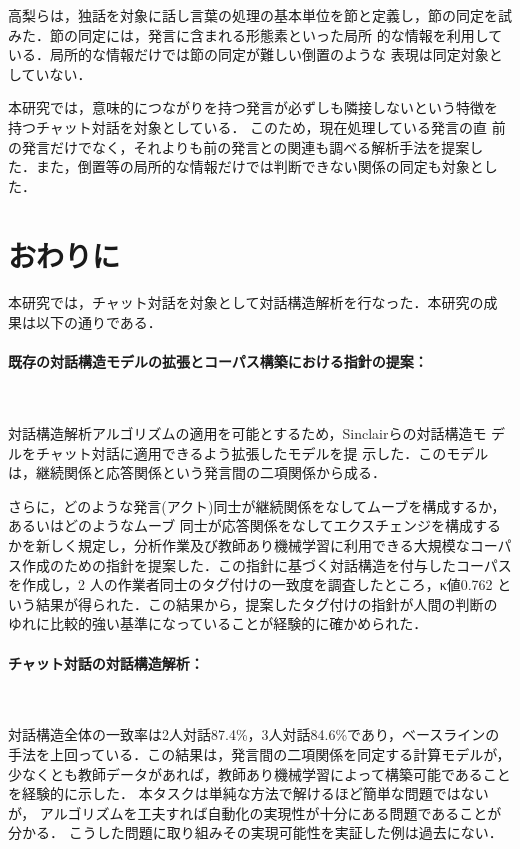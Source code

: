 高梨らは，独話を対象に話し言葉の処理の基本単位を節と定義し，節の同定を試
みた\cite{Takanashi:03}．節の同定には，発言に含まれる形態素といった局所
的な情報を利用している．局所的な情報だけでは節の同定が難しい倒置のような
表現は同定対象としていない．

本研究では，意味的につながりを持つ発言が必ずしも隣接しないという特徴を
持つチャット対話を対象としている． このため，現在処理している発言の直
前の発言だけでなく，それよりも前の発言との関連も調べる解析手法を提案し
た．また，倒置等の局所的な情報だけでは判断できない関係の同定も対象とし
た．
\section{おわりに}
本研究では，チャット対話を対象として対話構造解析を行なった．本研究の成
果は以下の通りである．

\paragraph{既存の対話構造モデルの拡張とコーパス構築における指針の提案：}

　

対話構造解析アルゴリズムの適用を可能とするため，Sinclairらの対話構造モ
デル\cite{Sinclair:92}をチャット対話に適用できるよう拡張したモデルを提
示した．このモデルは，継続関係と応答関係という発言間の二項関係から成る．

さらに，どのような発言(アクト)同士が継続関係をなしてムーブを構成するか，
あるいはどのようなムーブ 同士が応答関係をなしてエクスチェンジを構成する
かを新しく規定し，分析作業及び教師あり機械学習に利用できる大規模なコーパ
ス作成のための指針を提案した．この指針に基づく対話構造を付与したコーパス
を作成し，2 人の作業者同士のタグ付けの一致度を調査したところ，κ値0.762
という結果が得られた．この結果から，提案したタグ付けの指針が人間の判断の
ゆれに比較的強い基準になっていることが経験的に確かめられた．

\paragraph{チャット対話の対話構造解析：} 

　

対話構造全体の一致率は2人対話87.4\%，3人対話84.6\%であり，ベースラインの
手法を上回っている．この結果は，発言間の二項関係を同定する計算モデルが，
少なくとも教師データがあれば，教師あり機械学習によって構築可能であること
を経験的に示した． 本タスクは単純な方法で解けるほど簡単な問題ではないが，
アルゴリズムを工夫すれば自動化の実現性が十分にある問題であることが分かる．
こうした問題に取り組みその実現可能性を実証した例は過去にない．


